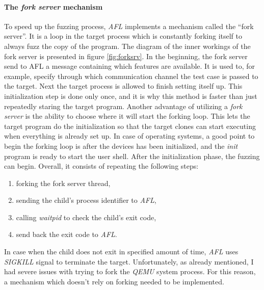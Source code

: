 \paragraph{The \textit{fork server} mechanism}
To speed up the fuzzing process, \textit{AFL} implements a mechanism called the “fork server”. It is a loop in the target process which is constantly forking itself to always fuzz the copy of the program. The diagram of the inner workings of the fork server is presented in figure \ref{fig:forksrv}. In the beginning, the fork server send to AFL a message containing which features are available. It is used to, for example, specify through which communication channel the test case is passed to the target. Next the target process is allowed to finish setting itself up. This initialization step is done only once, and it is why this method is faster than just repeatedly staring the target program. Another advantage of utilizing a \textit{fork server} is the ability to choose where it will start the forking loop. This lets the target program do the initialization so that the target clones can start executing when everything is already set up. In case of operating systems, a good point to begin the forking loop is after the devices has been initialized, and the \textit{init} program is ready to start the user shell. After the initialization phase, the fuzzing can begin. Overall, it consists of repeating the following steps:
\begin{enumerate}
    \item forking the fork server thread,
    \item sending the child's process identifier to \textit{AFL},
    \item calling \textit{waitpid} to check the child's exit code,
    \item send back the exit code to \textit{AFL}.
\end{enumerate}
In case when the child does not exit in specified amount of time, \textit{AFL} uses \textit{SIGKILL} signal to terminate the target. Unfortunately, as already mentioned, I had severe issues with trying to fork the \textit{QEMU} system process. For this reason, a mechanism which doesn't rely on forking needed to be implemented. 

